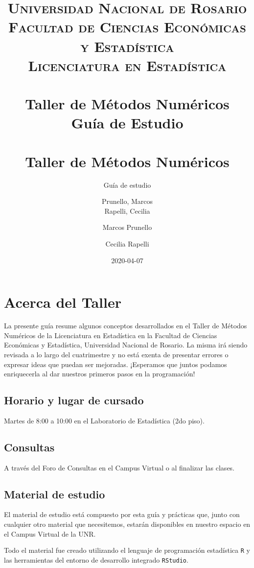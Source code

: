 \documentclass[openany]{book}
\title{
	\usefont{OT1}{bch}{b}{n}
	\normalfont \normalsize
	\textsc{
		Universidad Nacional de Rosario \\
		Facultad de Ciencias Económicas y Estadística \\
		Licenciatura en Estadística
	} \\ [25pt]
	\horrule{2pt} \\[0.4cm]
	\huge \textbf{Taller de Métodos Numéricos} \\
	\bigbreak
	Guía de Estudio\\
	\horrule{2pt} \\[0.5cm]}
\author{
	\normalfont Prunello, Marcos \\
	\normalfont Rapelli, Cecilia
}
\title{Taller de Métodos Numéricos}
\subtitle{Guía de estudio}
\author{Marcos Prunello \and Cecilia Rapelli}
\date{2020-04-07}
\begin{document}
\maketitle

{
\setcounter{tocdepth}{1}
\tableofcontents
}
\hypertarget{acerca-del-taller}{%
\chapter*{Acerca del Taller}\label{acerca-del-taller}}

La presente guía resume algunos conceptos desarrollados en el Taller de Métodos Numéricos de la Licenciatura en Estadística en la Facultad de Ciencias Económicas y Estadística, Universidad Nacional de Rosario. La misma irá siendo revisada a lo largo del cuatrimestre y no está exenta de presentar errores o expresar ideas que puedan ser mejoradas. ¡Esperamos que juntos podamos enriquecerla al dar nuestros primeros pasos en la programación!

\hypertarget{horario-y-lugar-de-cursado}{%
\section*{Horario y lugar de cursado}\label{horario-y-lugar-de-cursado}}

Martes de 8:00 a 10:00 en el Laboratorio de Estadística (2do piso).

\hypertarget{consultas}{%
\section*{Consultas}\label{consultas}}

A través del Foro de Consultas en el Campus Virtual o al finalizar las clases.

\hypertarget{material-de-estudio}{%
\section*{Material de estudio}\label{material-de-estudio}}

El material de estudio está compuesto por esta guía y prácticas que, junto con cualquier otro material que necesitemos, estarán disponibles en nuestro espacio en el Campus Virtual de la UNR.

Todo el material fue creado utilizando el lenguaje de programación estadística \texttt{R} y las herramientas del entorno de desarrollo integrado \texttt{RStudio}.
\end{document}

